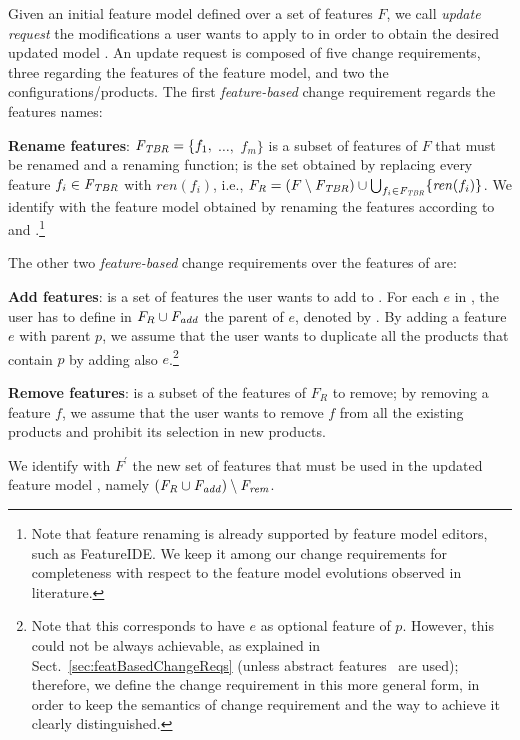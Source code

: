 \begin{tikzborder}{\cite{Gargantini16:validation}}
\begin{tikzborder}{\cite{gargantini_combinatorial_2017}}
\begin{tikzborder}{\cite{gargantini_combinatorial_2017}}
\begin{tikzborder}{\cite{garn2019}}
\begin{tikzborder}{\cite{arcaini2019achieving}}
	\begin{mydef}\label{def:fic1}
		Given an initial feature model \initFm defined over a set of features $F$, we call \emph{update request} \UR the modifications a user wants to apply to \initFm in order to obtain the desired updated model \fmp. An update request is composed of five change requirements, three regarding the features of the feature model, and two the configurations/products. The first \emph{feature-based} change requirement regards the features names:
		\begin{compactitem}
			\item {\bf Rename features}: $\mathit{F_{TBR}} = \{f_1,$ $\ldots,$ $f_m\}$ is a subset of features of $F$ that must be renamed and \rename a renaming function; \renamedFeatures is the set obtained by replacing every feature $f_i \in \mathit{F_{TBR}}$ with $\mathit{ren}(f_i)$, i.e., $\mathit{F_R} = (F \setminus \mathit{F_{TBR}}) \cup \bigcup_{f_i \in \mathit{F_{TBR}}} \{\mathit{ren}(f_i)\}$. We identify with \fmrenamed the feature model obtained by renaming the features according to \Ftbr and \rename.\footnote{Note that feature renaming is already supported by feature model editors, such as FeatureIDE. We keep it among our change requirements for completeness with respect to the feature model evolutions observed in literature.}
		\end{compactitem}
		The other two \emph{feature-based} change requirements over the features of \fmrenamed are:
		\begin{compactitem}
			\item {\bf Add features}: \Fadd is a set of features the user wants to add to \fmrenamed. For each $e$ in \Fadd, the user has to define in $F_R \cup \mathit{F_{add}}$ the parent of $e$, denoted by . By adding a feature $e$ with parent $p$, we assume that the user wants to duplicate all the products that contain $p$ by adding also $e$.\footnote{Note that this corresponds to have $e$ as optional feature of $p$. However, this could not be always achievable, as explained in Sect.~\ref{sec:featBasedChangeReqs} (unless abstract features~\cite{thum_abstract_2011} are used); therefore, we define the change requirement in this more general form, in order to keep the semantics of change requirement and the way to achieve it clearly distinguished.} 
			\item {\bf Remove features}: \Frem is a subset of the features of $F_R$ to remove; by removing a feature $f$, we assume that the user wants to remove $f$ from all the existing products and prohibit its selection in new products.
		\end{compactitem}
		We identify with $F^\prime$ the new set of features that must be used in the updated feature model \fmp, namely $(\mathit{F_R} \cup \mathit{F_{add}}) \setminus \mathit{F_{rem}}$.
		

\end{mydef}
\end{tikzborder}
\end{tikzborder}
\end{tikzborder}
\end{tikzborder}
\end{tikzborder}
